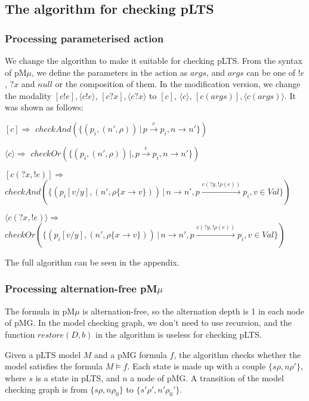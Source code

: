 \documentclass[runningheads,a4paper]{llncs}
\begin{document}
\subsection{The algorithm for checking pLTS}


\subsubsection{Processing parameterised action}
We change the algorithm to make it suitable for checking pLTS. From the syntax of pM$\mu$, we define the parameters in the action as $args$, and $args$ can be one of $!e$, $?x$ and $null$ or the composition of them. In the modification version, we change the modality $[c!e], \langle c!e\rangle$, $[c?x], \langle c?x\rangle$ to $[c]$, $\langle c\rangle$, $[c(args)], \langle c(args)\rangle$.
It was shown as follows:

$[c]\Rightarrow$ $checkAnd(\{ (p_{i}, (n', \rho))\,|\, p \xrightarrow{c} p_{i}, n\rightarrow n' \})$
		
$\langle c\rangle\Rightarrow$ 
	 $checkOr(\{ (p_{i}, (n',\rho))\,|, p \xrightarrow{c} p_{i}, n \rightarrow n'\})$
		
$[c(?x, !e)]\Rightarrow$
	$ checkAnd(\{ (p_{i}[v/y], (n',\rho\{x \rightarrow v\}))\,|\,  n \rightarrow n', p \xrightarrow{c(?y, !\rho(e)) } p_{i},v\in Val\})$
		
{$\langle c(?x, !e)\rangle\Rightarrow$}
	 $ checkOr(\{ (p_{i}[v/y], (n', \rho\{x \rightarrow v\}))\,|\,  n \rightarrow n', p \xrightarrow{c(?y, !\rho(e))} p_{i},v\in Val\})$
		
The full algorithm can be seen in the appendix.

\subsubsection{Processing alternation-free pM$\mu$}
The formula in pM$\mu$ is alternation-free, so the alternation depth is 1 in each node of pMG. In the model checking graph, we don't need to use recursion, and the function $restore(D, b)$ in the algorithm is useless for checking pLTS.

{\color{red}{[The principle of model checking]}}
Given a pLTS model $M$ and a pMG formula $f$, the algorithm checks whether the model satisfies the formula $M\models f$. Each state is made up with a couple $\{s\rho, n\rho'\}$, where $s$ is a state in pLTS, and $n$ a node of pMG. A transition of the model checking graph is from $\{s\rho, n\rho_{0}\}$ to $\{s'\rho', n'\rho_{0}'\}$. 
\end{document}
